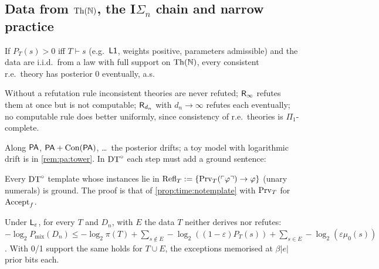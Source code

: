 \subsection{Data from \texorpdfstring{$\mathrm{Th}(\mathbb{N})$}{Th(N)}, the I\texorpdfstring{$\Sigma_n$}{Sigma-n} chain and narrow practice}\label{sec:pa:thn}

\begin{proposition}\pabrk{}\label{prop:pa:thn}
If $P_T(s)>0$ iff $T\vdash s$ (e.g.\ $\mathord{\mathsf{L1}}$, weights positive, parameters admissible) and the data are i.i.d.\ from a law with full support on $\mathrm{Th}(\mathbb{N})$, every consistent r.e.\ theory has posterior $0$ eventually, a.s.
\end{proposition}

\begin{proposition}[Refutation]\pabrk{}\label{prop:pa:refute}
Without a refutation rule inconsistent theories are never refuted; $\mathsf{R}_{\infty}$ refutes them at once but is not computable; $\mathsf{R}_{d_n}$ with $d_n\to\infty$ refutes each eventually; no computable rule does better uniformly, since consistency of r.e.\ theories is $\Pi_1$-complete.
\end{proposition}

\noindent Along $\mathsf{PA}$, $\mathsf{PA}+\mathrm{Con}(\mathsf{PA})$, \dots\ the posterior drifts; a toy model with logarithmic drift is in \cref{rem:pa:tower}. In $\mathrm{DT}^{\circ}$ each step must add a ground sentence:

\begin{proposition}\pabrk{}\label{prop:pa:refl}
Every $\mathrm{DT}^{\circ}$ template whose instances lie in $\mathrm{Refl}_T:=\{\mathrm{Prv}_T(\ulcorner \varphi\urcorner)\to\varphi\}$ (unary numerals) is ground. The proof is that of \cref{prop:time:notemplate} with $\mathrm{Prv}_T$ for $\mathrm{Accept}_{f}$.
\end{proposition}

\begin{proposition}\pabrk{}\label{prop:pa:regret}
Under $\mathsf{L}_{\varepsilon}$, for every $T$ and $D_n$, with $E$ the data $T$ neither derives nor refutes: $-\log_2P_{\mathrm{mix}}(D_n)\le-\log_2\pi(T)+\sum_{s\notin E}-\log_2((1-\varepsilon)P_T(s))+\sum_{s\in E}-\log_2(\varepsilon\mu_0(s))$. With 0/1 support the same holds for $T\cup E$, the exceptions memorised at $\beta|e|$ prior bits each.
\end{proposition}

